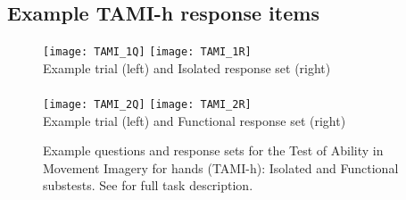     \subsection{Example TAMI-h response items}
        \label{sec:tami_example}
        \newcommand{\tamiscale}{.2655}
        \begin{figure}[h] \centering 
            \texttt{[image: TAMI\_1Q]}
            \texttt{[image: TAMI\_1R]} \\
            Example trial (left) and Isolated response set (right) \\~\\
            \texttt{[image: TAMI\_2Q]}
            \texttt{[image: TAMI\_2R]} \\  
            Example trial (left) and Functional response set (right) \\
            \caption[Example TAMI-h response items]{Example questions and response sets for the Test of Ability in Movement Imagery for hands (TAMI-h): Isolated and Functional substests. See  for full task description.} \label{fig:tami_example}
        \end{figure} 
    \newpage
    \singlespacing 
    
    